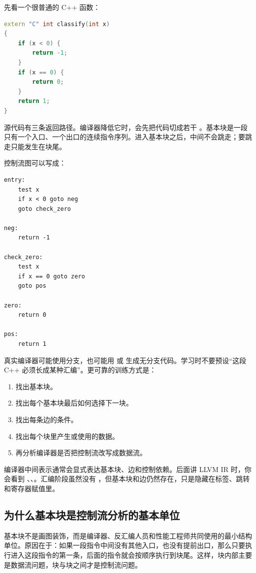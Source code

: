 先看一个很普通的 C++ 函数：

\begin{lstlisting}[language=C++]
extern "C" int classify(int x)
{
    if (x < 0) {
        return -1;
    }
    if (x == 0) {
        return 0;
    }
    return 1;
}
\end{lstlisting}

源代码有三条返回路径。编译器降低它时，会先把代码切成若干 。基本块是一段只有一个入口、一个出口的连续指令序列。进入基本块之后，中间不会跳走；要跳走只能发生在块尾。

控制流图可以写成：

\begin{lstlisting}
entry:
    test x
    if x < 0 goto neg
    goto check_zero

neg:
    return -1

check_zero:
    test x
    if x == 0 goto zero
    goto pos

zero:
    return 0

pos:
    return 1
\end{lstlisting}

真实编译器可能使用分支，也可能用  或  生成无分支代码。学习时不要预设“这段 C++ 必须长成某种汇编”。更可靠的训练方式是：

\begin{enumerate}
  \item 找出基本块。
  \item 找出每个基本块最后如何选择下一块。
  \item 找出每条边的条件。
  \item 找出每个块里产生或使用的数据。
  \item 再分析编译器是否把控制流改写成数据流。
\end{enumerate}

\begin{deepdive}
编译器中间表示通常会显式表达基本块、边和控制依赖。后面讲 LLVM IR 时，你会看到 、、。汇编阶段虽然没有 ，但基本块和边仍然存在，只是隐藏在标签、跳转和寄存器赋值里。
\end{deepdive}

\subsection{为什么基本块是控制流分析的基本单位}

基本块不是画图装饰，而是编译器、反汇编人员和性能工程师共同使用的最小结构单位。原因在于：如果一段指令中间没有其他入口，也没有提前出口，那么只要执行进入这段指令的第一条，后面的指令就会按顺序执行到块尾。这样，块内部主要是数据流问题，块与块之间才是控制流问题。

